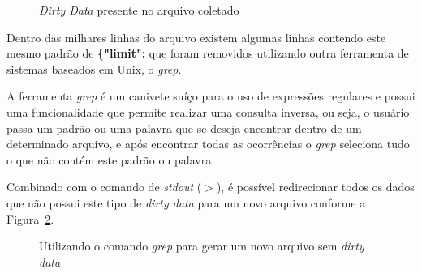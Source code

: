 \begin{figure}[h]
	\centering
	\caption{\textit{Dirty Data} presente no arquivo coletado}
	\vspace{-0.3cm}
	\label{fig-dirty}
\end{figure}

Dentro das milhares linhas do arquivo existem algumas linhas contendo este mesmo padrão de \textbf{\{"limit":} que foram removidos utilizando outra ferramenta de sistemas baseados em Unix, o \textit{grep}.

A ferramenta \textit{grep} é um canivete suíço para o uso de expressões regulares e possui uma funcionalidade que permite realizar uma consulta inversa, ou seja, o usuário passa um padrão ou uma palavra que se deseja encontrar dentro de um determinado arquivo, e após encontrar todas as ocorrências o \textit{grep} seleciona tudo o que não contém este padrão ou palavra.

Combinado com o comando de \textit{stdout} ($>$), é possível redirecionar todos os dados que não possui este tipo de \textit{dirty data} para um novo arquivo conforme a Figura~\ref{limpa-dado}.

\begin{figure}[h]
	\centering
	\caption{Utilizando o comando \textit{grep} para gerar um novo arquivo sem \textit{dirty data}}
	\vspace{-0.3cm}
	\label{limpa-dado}
\end{figure}

